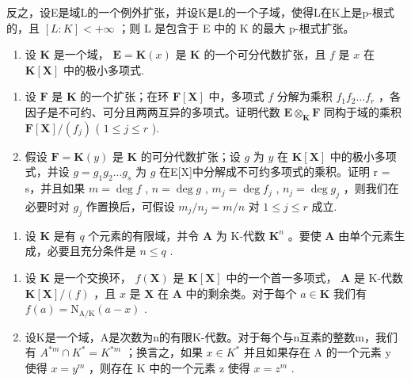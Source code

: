 反之，设E是域L的一个例外扩张，并设K是L的一个子域，使得L在K上是p-根式的，且 \([L:K]<+\infty\) ；则 L 是包含于 E 中的 K 的最大 p-根式扩张。

\begin{enumerate}
\def\labelenumi{\arabic{enumi})}
\setcounter{enumi}{3}
\tightlist
\item
  设 \(\mathbf{K}\) 是一个域， \(\mathbf{E} = \mathbf{K}(x)\) 是 \(\mathbf{K}\) 的一个可分代数扩张，且 \(f\) 是 \(x\) 在 \(\mathbf{K}[\mathbf{X}]\) 中的极小多项式.
\end{enumerate}

\begin{enumerate}
\def\labelenumi{\alph{enumi})}
\item
  设 \(\mathbf{F}\) 是 \(\mathbf{K}\) 的一个扩张；在环 \(\mathbf{F}[\mathbf{X}]\) 中，多项式 \(f\) 分解为乘积 \(f_{1}f_{2}\ldots f_{r}\) ，各因子是不可约、可分且两两互异的多项式。证明代数 \(\mathbf{E} \otimes_{\mathbf{K}} \mathbf{F}\) 同构于域的乘积 \(\mathbf{F}[\mathbf{X}] / (f_j)\) ( \(1 \leqslant j \leqslant r\) ).
\item
  假设 \(\mathbf{F} = \mathbf{K}(y)\) 是 \(\mathbf{K}\) 的可分代数扩张；设 \(g\) 为 \(y\) 在 \(\mathbf{K}[\mathbf{X}]\) 中的极小多项式，并设 \(g = g_1g_2\ldots g_s\) 为 \(g\) 在E{[}X{]}中分解成不可约多项式的乘积。证明 r = s，并且如果 \(m = \deg f\) , \(n = \deg g\) , \(m_j = \deg f_j\) , \(n_j = \deg g_j\) ，则我们在必要时对 \(g_j\) 作置换后，可假设 \(m_j / n_j = m / n\) 对 \(1 \leq j \leq r\) 成立.
\end{enumerate}

\begin{enumerate}
\def\labelenumi{\arabic{enumi})}
\setcounter{enumi}{4}
\tightlist
\item
  设 \(\mathbf{K}\) 是有 \(q\) 个元素的有限域，并令 \(\mathbf{A}\) 为 K-代数 \(\mathbf{K}^n\) 。要使 \(\mathbf{A}\) 由单个元素生成，必要且充分条件是 \(n \leqslant q\) .
\end{enumerate}

\BourbakiExerciseGroup

\begin{enumerate}
\def\labelenumi{\arabic{enumi})}
\item
  设 \(\mathbf{K}\) 是一个交换环， \(f(\mathbf{X})\) 是 \(\mathbf{K}[\mathbf{X}]\) 中的一个首一多项式， \(\mathbf{A}\) 是 K-代数 \(\mathbf{K}[\mathbf{X}] / (f)\) ，且 \(x\) 是 \(\mathbf{X}\) 在 \(\mathbf{A}\) 中的剩余类。对于每个 \(a \in \mathbf{K}\) 我们有 \(f(a) = \mathrm{N}_{\mathrm{A} / \mathrm{K}}(a - x)\) .
\item
  设K是一个域，A是次数为n的有限K-代数。对于每个与n互素的整数m，我们有 \(A^{*m} \cap K^{*} = K^{*m}\) ；换言之，如果 \(x \in K^{*}\) 并且如果存在 A 的一个元素 y 使得 \(x = y^{m}\) ，则存在 K 中的一个元素 z 使得 \(x = z^{m}\) .
\end{enumerate}

